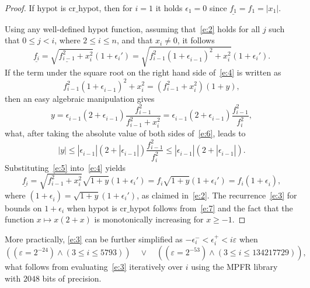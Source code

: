 \documentclass[a4paper,12pt,twoside]{article}
\begin{document}
\begin{proof}
  If $\mathrm{hypot}$ is $\mathrm{cr\_hypot}$, then for $i=1$ it holds
  $\epsilon_1=0$ since $\underline{f_1}=f_1=|x_1|$.

  Using any well-defined $\mathrm{hypot}$ function, assuming
  that~\eqref{e:2} holds for all $j$ such that $0\le j<i$, where
  $2\le i\le n$, and that $x_i\ne 0$, it follows
  \begin{equation}
    \underline{f_i^{}}=\sqrt{\underline{f_{i-1}^2}+x_i^2}(1+\epsilon_i')=\sqrt{f_{i-1}^2(1+\epsilon_{i-1}^{})^2+x_i^2}(1+\epsilon_i').
    \label{e:4}
  \end{equation}
  If the term under the square root on the right hand side
  of~\eqref{e:4} is written as
  \begin{equation}
    f_{i-1}^2(1+\epsilon_{i-1}^{})^2+x_i^2=(f_{i-1}^2+x_i^2)(1+y),
    \label{e:5}
  \end{equation}
  then an easy algebraic manipulation gives
  \begin{equation}
    y=\epsilon_{i-1}^{}(2+\epsilon_{i-1}^{})\frac{f_{i-1}^2}{f_{i-1}^2+x_i^2}=\epsilon_{i-1}^{}(2+\epsilon_{i-1}^{})\frac{f_{i-1}^2}{f_i^2},
    \label{e:6}
  \end{equation}
  what, after taking the absolute value of both sides of~\eqref{e:6},
  leads to
  \begin{equation}
    |y|\le|\epsilon_{i-1}^{}|(2+|\epsilon_{i-1}^{}|)\frac{f_{i-1}^2}{f_i^2}\le|\epsilon_{i-1}^{}|(2+|\epsilon_{i-1}^{}|).
    \label{e:7}
  \end{equation}
  Substituting~\eqref{e:5} into~\eqref{e:4} yields
  \begin{displaymath}
    \underline{f_i^{}}=\sqrt{f_{i-1}^2+x_i^2}\sqrt{1+y}(1+\epsilon_i')=f_i^{}\sqrt{1+y}(1+\epsilon_i')=f_i^{}(1+\epsilon_i^{}),
  \end{displaymath}
  where $(1+\epsilon_i^{})=\sqrt{1+y}(1+\epsilon_i')$, as claimed
  in~\eqref{e:2}.  The recurrence~\eqref{e:3} for bounds on
  $1+\epsilon_i$ when $\mathrm{hypot}$ is $\mathrm{cr\_hypot}$ follows
  from~\eqref{e:7} and the fact that the function $x\mapsto x(2+x)$ is
  monotonically increasing for $x\ge-1$.
\end{proof}

More practically, \eqref{e:3} can be further simplified as
$-\epsilon_i^-<\epsilon_i^+<i\varepsilon$ when
\begin{displaymath}
  ((\varepsilon=2^{-24})\wedge(3\le i\le 5793))\quad\vee\quad((\varepsilon=2^{-53})\wedge(3\le i\le 134217729)),
\end{displaymath}
what follows from evaluating~\eqref{e:3} iteratively over $i$ using
the MPFR library~\cite{Fousse-et-al-07} with $2048$ bits of precision.
\end{document}
